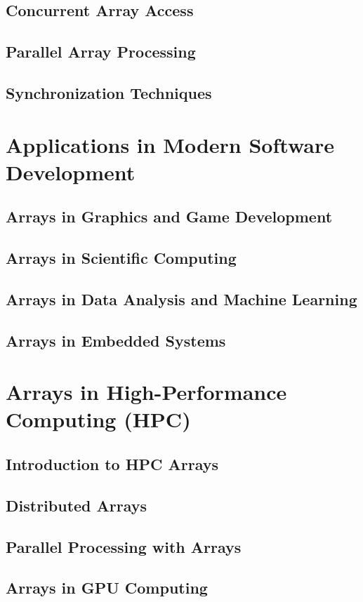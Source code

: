 \documentclass[12pt, oneside]{book}
\begin{document}
	\section{Concurrent Array Access}
	\section{Parallel Array Processing}
	\section{Synchronization Techniques}
	
	\chapter{Applications in Modern Software Development}
	\section{Arrays in Graphics and Game Development}
	\section{Arrays in Scientific Computing}
	\section{Arrays in Data Analysis and Machine Learning}
	\section{Arrays in Embedded Systems}
	
	\chapter{Arrays in High-Performance Computing (HPC)}
	\section{Introduction to HPC Arrays}
	\section{Distributed Arrays}
	\section{Parallel Processing with Arrays}
	\section{Arrays in GPU Computing}
\end{document}
